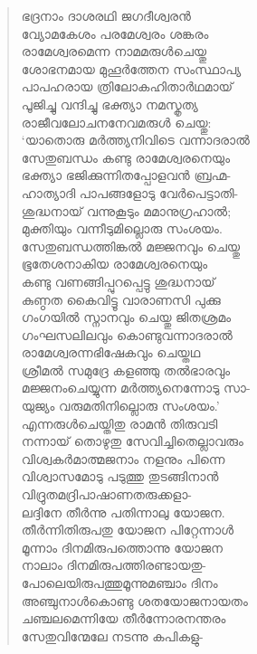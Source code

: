 \begin{verse}
ഭദ്രനാം ദാശരഥി ജഗദീശ്വരന്‍\\
വ്യോമകേശം പരമേശ്വരം ശങ്കരം\\
രാമേശ്വരമെന്ന നാമമരുള്‍ചെയ്തു\\
ശോഭനമായ മുഹൂര്‍ത്തേന സംസ്ഥാപ്യ\\
പാപഹരായ ത്രിലോകഹിതാര്‍ഥമായ്\\
പൂജിച്ചു വന്ദിച്ചു ഭക്ത്യാ നമസ്കൃത്യ\\
രാജീവലോചനനേവമരുള്‍ ചെയ്തു:\\
‘യാതൊരു മര്‍ത്ത്യനിവിടെ വന്നാദരാല്‍\\
സേതുബന്ധം കണ്ടു രാമേശ്വരനെയും\\
ഭക്ത്യാ ഭജിക്കുന്നിതപ്പോളവന്‍ ബ്രഹ്മ-\\
ഹാത്യാദി പാപങ്ങളോടു വേര്‍പെട്ടാതി-\\
ശുദ്ധനായ് വന്നുകൂടും മമാനുഗ്രഹാല്‍;\\
മുക്തിയും വന്നീടുമില്ലൊരു സംശയം.\\
സേതുബന്ധത്തിങ്കല്‍ മജ്ജനവും ചെയ്തു\\
ഭൂതേശനാകിയ രാമേശ്വരനെയും\\
കണ്ടു വണങ്ങിപ്പുറപ്പെട്ടു ശുദ്ധനായ്\\
കുണ്ഠത കൈവിട്ടൂ വാരാണസി പുക്കു\\
ഗംഗയില്‍ സ്നാനവും ചെയ്തു ജിതശ്രമം\\
ഗംഘസലിലവും കൊണ്ടുവന്നാദരാല്‍\\
രാമേശ്വരന്നഭിഷേകവും ചെയ്തഥ\\
ശ്രീമല്‍ സമുദ്രേ കളഞ്ഞു തല്‍ഭാരവും\\
മജ്ജനംചെയ്യുന്ന മര്‍ത്ത്യനെന്നോടു സാ-\\
യുജ്യം വരുമതിനില്ലൊരു സംശയം.’\\
എന്നരുള്‍ചെയ്തിതു രാമന്‍ തിരുവടി\\
നന്നായ് തൊഴുതു സേവിച്ചിതെല്ലാവരും\\
വിശ്വകര്‍മാത്മജനാം നളനും പിന്നെ\\
വിശ്വാസമോടു പടുത്തു തുടങ്ങിനാന്‍\\
വിദ്രുതമദ്രിപാഷാണതരുക്കളാ-\\
ലദ്ദിനേ തീര്‍ന്നു പതിന്നാലു യോജന.\\
തീര്‍ന്നിതിരുപതു യോജന പിറ്റേന്നാള്‍\\
മൂന്നാം ദിനമിരുപത്തൊന്നു യോജന\\
നാലാം ദിനമിരുപത്തിരണ്ടായതു-\\
പോലെയിരുപത്തുമൂന്നുമഞ്ചാം ദിനം\\
അഞ്ചുനാള്‍കൊണ്ടു ശതയോജനായതം\\
ചഞ്ചലമെന്നിയേ തീര്‍ന്നോരനന്തരം\\
സേതുവിന്മേലേ നടന്നു കപികളു-\\

\end{verse}
